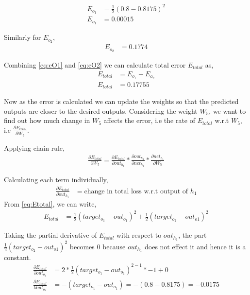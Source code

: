 \begin{align}
    E_{o_{1}} &= \frac{1}{2} (0.8-0.8175)^{2}\\
    E_{o_{1}} &= 0.00015  \label{eq:eO1}
\end{align}

Similarly for $E_{o_{2}}$,
\begin{align}\label{eq:eO2}
    E_{o_{2}} &= 0.1774
\end{align}

Combining \ref{eq:eO1} and \ref{eq:eO2} we can calculate total error $E_{total}$ as,
\begin{align}
    E_{total} &= E_{o_{1}} + E_{o_{2}} \label{eq:Etotal}\\
    E_{total} &= 0.17755
\end{align}

Now as the error is calculated we can update the weights so that the predicted outputs are closer to the desired outputs.
Considering the weight $W_{5}$, we want to find out how much change in $W_{5}$ affects the error, i.e the rate of $E_{total}$ w.r.t $W_{5}$, i.e $\frac{\partial E_{total} }{\partial W_{5}}$. 

Applying chain rule, 
\begin{align}
    \frac{\partial E_{total} }{\partial W_{5}} = \frac{\partial E_{total} }{\partial out_{h_{1}}} * \frac{\partial out_{h_{1}} }{\partial net_{h_{1}}} *  \frac{\partial net_{h_{1}} }{\partial W_{5}} \label{eq:backpropMain}
\end{align}

Calculating each term individually,
\begin{align}
    \frac{\partial E_{total} }{\partial out_{h_{1}}} &= \text{change in total loss w.r.t output of $h_{1}$}
\end{align}
From \ref{eq:Etotal}, we can write,
\begin{align}
    E_{total} &= \frac{1}{2}(target_{o_{1}} - out_{o_{1}})^{2} + \frac{1}{2}(target_{o_{2}} - out_{o{1}})^{2}
\end{align}

Taking the partial derivative of $E_{total}$ with respect to $out_{h_{1}}$, the part $\frac{1}{2}(target_{o_{2}} - out_{o{1}})^{2}$ becomes 0 because $out_{h_{1}}$ does not effect it and hence it is a constant.
\begin{align}
    \frac{\partial E_{total}}{\partial out_{o_{1}}} &= 2 * \frac{1}{2}(target_{o_{1}} - out_{o_{1}})^{2 - 1} * -1 + 0\\
    \frac{\partial E_{total}}{\partial out_{o_{1}}} &= -(target_{o_{1}} - out_{o_{1}}) = -(0.8 - 0.8175) = -0.0175 \label{eq:Backprop_2}
\end{align}

